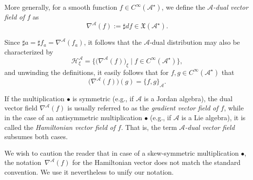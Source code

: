 \documentclass[10pt,a4paper]{amsart}
\numberwithin{equation}{section}
\newcommand{\be}{\begin{equation}}
\newcommand{\ee}{\end{equation}}
\newcommand{\lra}{\longrightarrow}
\newcommand{\hh}{\mathcal{H}}
\newcommand{\dcal}{\mathcal{D}}
\newcommand{\m}{\mathfrak{m}}
\newcommand{\G}{\mathrm{G}}
\newcommand{\Gl}{{\mathrm{Gl}}}
\renewcommand{\m}{{\mathfrak m}}
\newcommand{\gl}{{\mathfrak{gl}}}
\newcommand{\cA}{\mathcal{A}}
\begin{document}
More generally, for a smooth function $f \in C^\infty(\cA^\star)$, we define the {\em $\cA$-dual vector field of $f$} as
\be \label{eq:grad-A}
\nabla^{\cA}(f) := \sharp df \in \mathfrak{X}(\cA^\star).
\ee

Since $\sharp a = \sharp f_a = \nabla^\cA(f_a)$, it follows that the $\cA$-dual distribution may also be characterized by
\[%
\hh^\cA_\xi = \big\{ \big(\nabla^\cA(f)\big)_\xi \mid f \in C^\infty(\cA^\star)\big\},
\]
and unwinding the definitions, it easily follows that for $f, g \in C^\infty(\cA^\star)$ that
\[%
\big(\nabla^\cA(f)\big)(g) = \{f, g\}_\cA.
\]

\begin{Remark} If the multiplication $\bullet$ is symmetric (e.g., if $\cA$ is a Jordan algebra), the dual vector field $\nabla^\cA(f)$ is usually referred to as the {\em gradient vector field of $f$}, while in the case of an antisymmetric multiplication $\bullet$ (e.g., if $\cA$ is a Lie algebra), it is called the {\em Hamiltonian vector field of $f$}. That is, the term {\em $\cA$-dual vector field }subsumes both cases.

We wish to caution the reader that in case of a skew-symmetric multiplication $\bullet$, the notation~$\nabla^{\cA}(f)$ for the Hamiltonian vector does not match the standard convention. We use it nevertheless to unify our notation.
\end{Remark}

%
\end{document}
